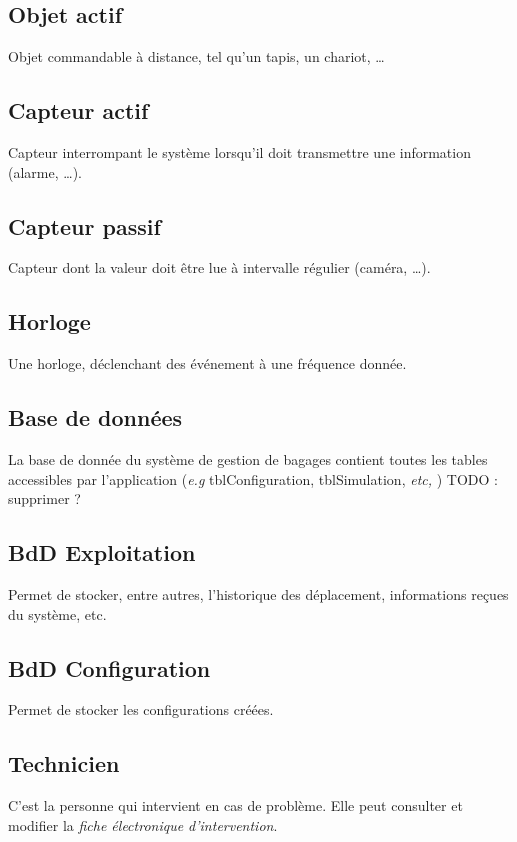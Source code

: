 \subsection{Objet actif}
Objet commandable à distance, tel qu'un tapis, un chariot, \ldots

\subsection{Capteur actif}
Capteur interrompant le système lorsqu'il doit transmettre une information (alarme, \ldots).

\subsection{Capteur passif}
Capteur dont la valeur doit être lue à intervalle régulier (caméra, \ldots).

\subsection{Horloge}
Une horloge, déclenchant des événement à une fréquence donnée.

\subsection{Base de données}
La base de donnée du système de gestion de bagages contient toutes les tables accessibles par l'application (\textsl{e.g} tblConfiguration, tblSimulation, \textsl{etc,} )
{\huge TODO : supprimer ?}

\subsection{BdD Exploitation}
Permet de stocker, entre autres, l'historique des déplacement, informations reçues du système, etc.

\subsection{BdD Configuration}
Permet de stocker les configurations créées.

\subsection{Technicien}
C'est la personne qui intervient en cas de problème. Elle peut consulter et modifier la \textsl{fiche électronique d'intervention}.




